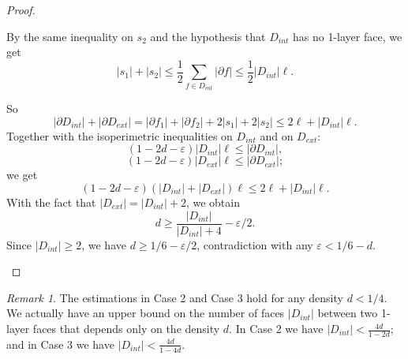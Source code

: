 \documentclass[a4paper]{article}
\theoremstyle{remark}
\newtheorem{rem}[thm]{Remark}
\begin{document}
\begin{proof}
\begin{enumerate}
    By the same inequality on $s_2$ and the hypothesis that $D_{int}$ has no 1-layer face, we get
    \[|s_1|+|s_2| \leq \frac{1}{2}\sum_{f\in D_{int}} |\partial f|\leq \frac{1}{2}|D_{int}|\ell.\]

    So \[|\partial D_{int}|+|\partial D_{ext}| = |\partial f_1|+|\partial f_2|+2|s_1|+2|s_2|\leq 2\ell+|D_{int}|\ell.\]
    Together with the isoperimetric inequalities on $D_{int}$ and on $D_{ext}$: 
    \[(1-2d-\varepsilon)|D_{int}|\ell \leq |\partial D_{int}|,\]
    \[(1-2d-\varepsilon)|D_{ext}|\ell \leq |\partial D_{ext}|;\]
    we get
    \[(1-2d-\varepsilon)(|D_{int}|+|D_{ext}|)\ell\leq 2\ell+|D_{int}|\ell.\]
    With the fact that $|D_{ext}|=|D_{int}|+2$, we obtain
    \[d\geq \frac{|D_{int}|}{|D_{int}|+4}-\varepsilon/2.\]
    Since $|D_{int}|\geq 2$, we have $d\geq 1/6-\varepsilon/2$, contradiction with any $\varepsilon<1/6-d$.
\end{enumerate}
\end{proof}

\begin{rem}
    The estimations in Case 2 and Case 3 hold for any density $d<1/4$. We actually have an upper bound on the number of faces $|D_{int}|$ between two 1-layer faces that depends only on the density $d$. In Case 2 we have $|D_{int}|< \frac{4d}{1-2d}$; and in Case 3 we have $|D_{int}|< \frac{4d}{1-4d}$.
\end{rem}
\end{document}
